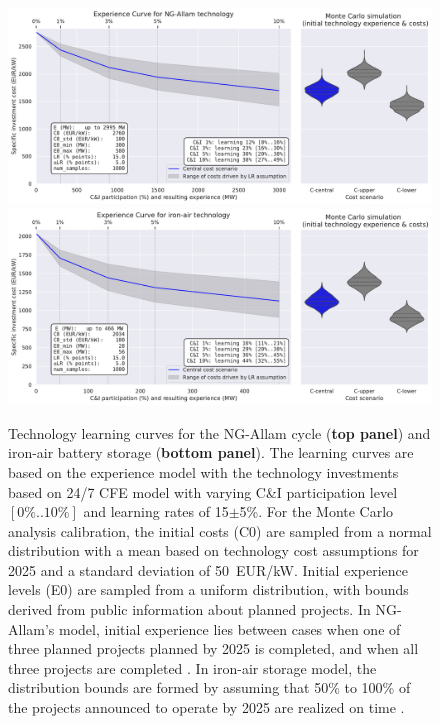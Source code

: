 \documentclass[pdflatex,sn-basic, Numbered]{sn-jnl}%
\theoremstyle{thmstyleone}%
\theoremstyle{thmstyletwo}%
\theoremstyle{thmstylethree}%
\begin{document}
\begin{figure}[htbp]
    \centering
    \includegraphics[width=\textwidth]{images/e_curve_NG-Allam.pdf}
    \includegraphics[width=\textwidth]{images/e_curve_iron-air.pdf}
    \caption{Technology learning curves for the NG-Allam cycle (\textbf{top panel}) and iron-air battery storage (\textbf{bottom panel}).
    The learning curves are based on the experience model with the technology investments based on 24/7 CFE model with varying C\&I participation level $[0\%..10\%]$ and learning rates of 15$\pm$5\%.
    For the Monte Carlo analysis calibration, the initial costs (C0) are sampled from a normal distribution with a mean based on technology cost assumptions for 2025 and a standard deviation of 50~EUR/kW. Initial experience levels (E0) are sampled from a uniform distribution, with bounds derived from public information about planned projects. In NG-Allam's model, initial experience lies between cases when one of three planned projects planned by 2025 is completed, and when all three projects are completed \cite{BroadwingEnergyProject, CoyoteCleanPower, FrogLakeProject}. In iron-air storage model, the distribution bounds are formed by assuming that 50\% to 100\% of the projects announced to operate by 2025 are realized on time \cite{FormEnergyLatest2024}.
    }
    \label{fig:panels}
\end{figure}
\end{document}
